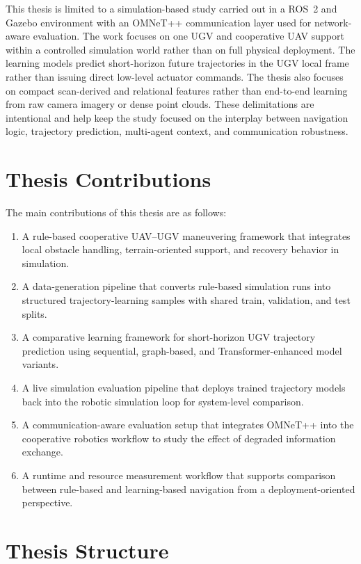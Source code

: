 This thesis is limited to a simulation-based study carried out in a ROS~2 and Gazebo environment with an OMNeT++ communication layer used for network-aware evaluation. The work focuses on one UGV and cooperative UAV support within a controlled simulation world rather than on full physical deployment. The learning models predict short-horizon future trajectories in the UGV local frame rather than issuing direct low-level actuator commands. The thesis also focuses on compact scan-derived and relational features rather than end-to-end learning from raw camera imagery or dense point clouds. These delimitations are intentional and help keep the study focused on the interplay between navigation logic, trajectory prediction, multi-agent context, and communication robustness.

\section{Thesis Contributions}

The main contributions of this thesis are as follows:

\begin{enumerate}
    \item A rule-based cooperative UAV--UGV maneuvering framework that integrates local obstacle handling, terrain-oriented support, and recovery behavior in simulation.
    \item A data-generation pipeline that converts rule-based simulation runs into structured trajectory-learning samples with shared train, validation, and test splits.
    \item A comparative learning framework for short-horizon UGV trajectory prediction using sequential, graph-based, and Transformer-enhanced model variants.
    \item A live simulation evaluation pipeline that deploys trained trajectory models back into the robotic simulation loop for system-level comparison.
    \item A communication-aware evaluation setup that integrates OMNeT++ into the cooperative robotics workflow to study the effect of degraded information exchange.
    \item A runtime and resource measurement workflow that supports comparison between rule-based and learning-based navigation from a deployment-oriented perspective.
\end{enumerate}

\section{Thesis Structure}

